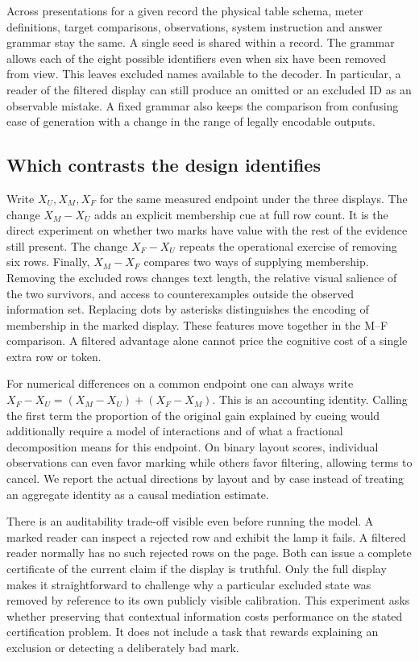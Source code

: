 \documentclass[12pt,letterpaper]{article}
\begin{document}
Across presentations for a given record the physical table schema, meter definitions, target comparisons, observations, system instruction and answer grammar stay the same. A single seed is shared within a record. The grammar allows each of the eight possible identifiers even when six have been removed from view. This leaves excluded names available to the decoder. In particular, a reader of the filtered display can still produce an omitted or an excluded ID as an observable mistake. A fixed grammar also keeps the comparison from confusing ease of generation with a change in the range of legally encodable outputs.

\subsection{Which contrasts the design identifies}

Write $X_U,X_M,X_F$ for the same measured endpoint under the three displays. The change $X_M-X_U$ adds an explicit membership cue at full row count. It is the direct experiment on whether two marks have value with the rest of the evidence still present. The change $X_F-X_U$ repeats the operational exercise of removing six rows. Finally, $X_M-X_F$ compares two ways of supplying membership. Removing the excluded rows changes text length, the relative visual salience of the two survivors, and access to counterexamples outside the observed information set. Replacing dots by asterisks distinguishes the encoding of membership in the marked display. These features move together in the M--F comparison. A filtered advantage alone cannot price the cognitive cost of a single extra row or token.

For numerical differences on a common endpoint one can always write $X_F-X_U=(X_M-X_U)+(X_F-X_M)$. This is an accounting identity. Calling the first term the proportion of the original gain explained by cueing would additionally require a model of interactions and of what a fractional decomposition means for this endpoint. On binary layout scores, individual observations can even favor marking while others favor filtering, allowing terms to cancel. We report the actual directions by layout and by case instead of treating an aggregate identity as a causal mediation estimate.

There is an auditability trade-off visible even before running the model. A marked reader can inspect a rejected row and exhibit the lamp it fails. A filtered reader normally has no such rejected rows on the page. Both can issue a complete certificate of the current claim if the display is truthful. Only the full display makes it straightforward to challenge why a particular excluded state was removed by reference to its own publicly visible calibration. This experiment asks whether preserving that contextual information costs performance on the stated certification problem. It does not include a task that rewards explaining an exclusion or detecting a deliberately bad mark.
\end{document}
